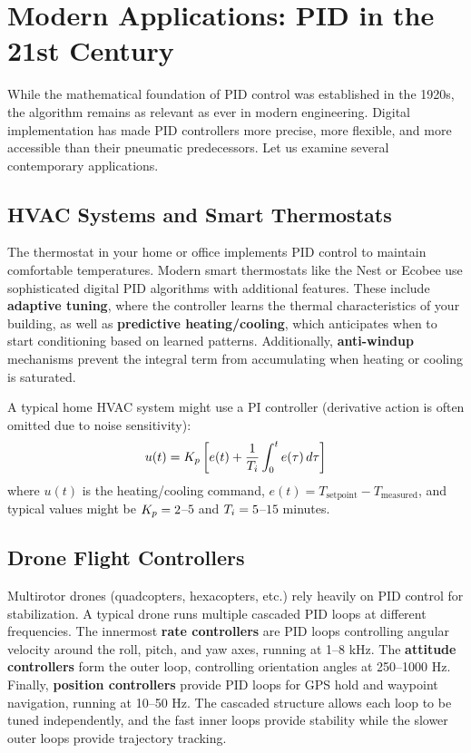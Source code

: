 \section{Modern Applications: PID in the 21st Century}

While the mathematical foundation of PID control was established in the 1920s, the algorithm remains as relevant as ever in modern engineering. Digital implementation has made PID controllers more precise, more flexible, and more accessible than their pneumatic predecessors. Let us examine several contemporary applications.

\subsection{HVAC Systems and Smart Thermostats}

The thermostat in your home or office implements PID control to maintain comfortable temperatures. Modern smart thermostats like the Nest or Ecobee use sophisticated digital PID algorithms with additional features. These include \textbf{adaptive tuning}, where the controller learns the thermal characteristics of your building, as well as \textbf{predictive heating/cooling}, which anticipates when to start conditioning based on learned patterns. Additionally, \textbf{anti-windup} mechanisms prevent the integral term from accumulating when heating or cooling is saturated.

A typical home HVAC system might use a PI controller (derivative action is often omitted due to noise sensitivity):
\begin{equation}
u(t) = K_p \left[ e(t) + \frac{1}{T_i} \int_0^t e(\tau) \, d\tau \right]
\end{equation}
where $u(t)$ is the heating/cooling command, $e(t) = T_{\text{setpoint}} - T_{\text{measured}}$, and typical values might be $K_p = 2$--$5$ and $T_i = 5$--$15$ minutes.

\subsection{Drone Flight Controllers}

Multirotor drones (quadcopters, hexacopters, etc.) rely heavily on PID control for stabilization. A typical drone runs multiple cascaded PID loops at different frequencies. The innermost \textbf{rate controllers} are PID loops controlling angular velocity around the roll, pitch, and yaw axes, running at 1--8 kHz. The \textbf{attitude controllers} form the outer loop, controlling orientation angles at 250--1000 Hz. Finally, \textbf{position controllers} provide PID loops for GPS hold and waypoint navigation, running at 10--50 Hz. The cascaded structure allows each loop to be tuned independently, and the fast inner loops provide stability while the slower outer loops provide trajectory tracking.

